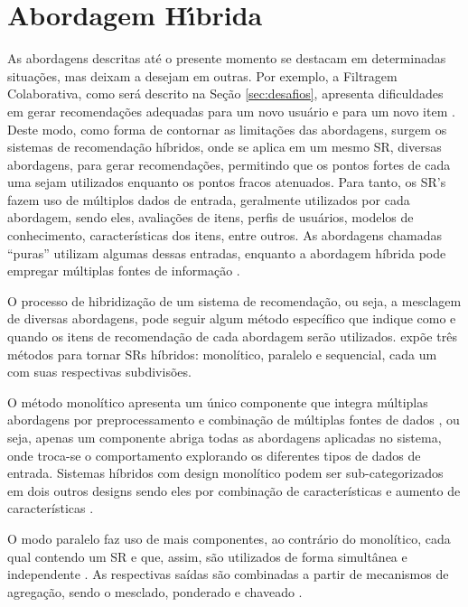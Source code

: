 \section{Abordagem H\'{\i}brida}

    As abordagens descritas até o presente momento se destacam em determinadas situações, mas deixam a desejam em outras. Por exemplo, a Filtragem Colaborativa, como será descrito na Seção \ref{sec:desafios}, apresenta dificuldades em gerar recomendações adequadas para um novo usuário e para um novo item \cite{Ricci2010}. Deste modo, como forma de contornar as limitações das abordagens, surgem os sistemas de recomendação híbridos, onde se aplica em um mesmo SR, diversas abordagens, para gerar recomendações, permitindo que os pontos fortes de cada uma sejam utilizados enquanto os pontos fracos atenuados. Para tanto, os SR's fazem uso de múltiplos dados de entrada, geralmente utilizados por cada abordagem, sendo eles, avaliações de itens, perfis de usuários, modelos de conhecimento, características dos itens, entre outros. As abordagens chamadas ``puras'' utilizam algumas dessas entradas, enquanto a abordagem híbrida pode empregar múltiplas fontes de informação \cite{Jannach2010}.
    
    O processo de hibridização de um sistema de recomendação, ou seja, a mesclagem de diversas abordagens, pode seguir algum método específico que indique como e quando os itens de recomendação de cada abordagem serão utilizados.  expõe três métodos para tornar SRs híbridos: monolítico, paralelo e sequencial, cada um com suas respectivas subdivisões.
    
    O método monolítico apresenta um único componente que integra múltiplas abordagens por preprocessamento e combinação de múltiplas fontes de dados \cite{Aggarwal2016}, ou seja, apenas um componente abriga todas as abordagens aplicadas no sistema, onde troca-se o comportamento explorando os diferentes tipos de dados de entrada. Sistemas híbridos com design monolítico podem ser sub-categorizados em dois outros designs sendo eles por combinação de características e aumento de características \cite{Jannach2010}.
    
    O modo paralelo faz uso de mais componentes, ao contrário do monolítico, cada qual contendo um SR e que, assim, são utilizados de forma simultânea e independente \cite{Aggarwal2016}. As respectivas saídas são combinadas a partir de mecanismos de agregação, sendo o mesclado, ponderado e chaveado \cite{Jannach2010}. 
    
